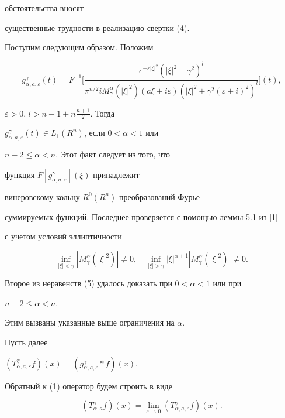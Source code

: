 обстоятельства вносят  


существенные трудности в реализацию свертки (4). 


 


Поступим следующим образом. Положим 


$$ 


g^\gamma_{\alpha,a,\varepsilon}(t)=F^{-1}\bigg[ 


\frac{e^{-\varepsilon|\xi|^2}(|\xi|^2-\gamma^2)^l} 


{\pi^{n/2}i M^\alpha_\gamma(|\xi|^2)(a\xi+i\varepsilon) 


(|\xi|^2+\gamma^2(\varepsilon+i)^2)^l}\bigg](t), 


$$ 


$\varepsilon>0$, $l>n-1+n\frac{n+1}{2}$. Тогда 


$g^\gamma_{\alpha,a,\varepsilon}(t)\in L_1(R^n)$, если $0<\alpha<1$ или 


$n-2\le\alpha<n$. Этот факт следует из того, что  


функция $F[g^\gamma_{\alpha,a,\varepsilon}](\xi)$ принадлежит 


винеровскому кольцу $R^0(R^n)$ преобразований Фурье  


суммируемых функций. Последнее проверяется с помощью леммы 5.1 из [1] 


с учетом условий эллиптичности 


\begin{equation} 


\inf_{|\xi|<\gamma}|M^\alpha_\gamma(|\xi|^2)|\ne0,\quad 


\inf_{|\xi|>\gamma}|\xi|^{\alpha+1} 


|M^\alpha_\gamma(|\xi|^2)|\ne0. 


\end{equation} 


Второе из неравенств (5) удалось доказать при $0<\alpha<1$ или при 


$n-2\le\alpha<n$. 


Этим вызваны указанные выше ограничения на $\alpha$. 


Пусть далее 


$(T^\gamma_{\alpha,a,\varepsilon}f)(x)= 


(g^\gamma_{\alpha,a,\varepsilon}*f)(x)$. 


Обратный к (1) оператор будем строить в виде 


\begin{equation} 


(T^\gamma_{\alpha,a}f)(x)=\lim_{\varepsilon\to 0} 


(T^\gamma_{\alpha,a,\varepsilon}f)(x). 


\end{equation} 


